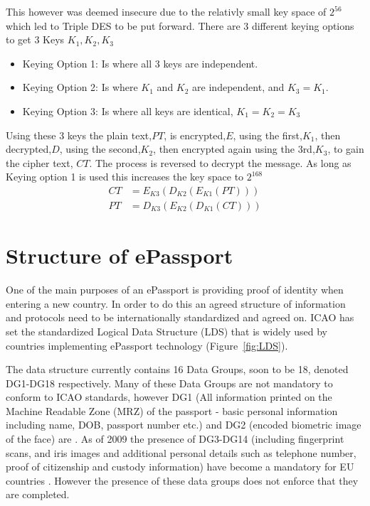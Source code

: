 \documentclass[12pt]{article}
\begin{document}
This however was deemed insecure due to the relativly small key space of $2^{56}$ which led to Triple DES to be put forward. There are 3 different keying options to get 3 Keys $K_1,K_2,K_3$
\begin{itemize}
    \item Keying Option 1: Is where all 3 keys are independent.
    \item Keying Option 2: Is where $K_1$ and $K_2$ are independent, and $K_3 = K_1$.
    \item Keying Option 3: Is where all keys are identical, $K_1 = K_2 = K_3$
\end{itemize}

Using these 3 keys the plain text,$PT$, is encrypted,$E$, using the first,$K_1$, then decrypted,$D$, using the second,$K_2$, then encrypted again using the 3rd,$K_3$, to gain the cipher text, $CT$. The process is reversed to decrypt the message. As long as Keying option 1 is used this increases the key space to $2^{168}$
\begin{align}
    CT &= E_{K3}(D_{K2}(E_{K1}(PT)))\\
    PT &= D_{K3}(E_{K2}(D_{K1}(CT)))
\end{align}
\section{Structure of ePassport}
\label{sec:LDS}
One of the main purposes of an ePassport is providing proof of identity when entering a new country. In order to do this an agreed structure of information and protocols need to be internationally standardized and agreed on. ICAO has set the standardized Logical Data Structure (LDS) that is widely used by countries implementing ePassport technology (Figure~\ref{fig:LDS}).

The data structure currently contains 16 Data Groups, soon to be 18, denoted DG1-DG18 respectively. Many of these Data Groups are not mandatory to conform to ICAO standards, however DG1 (All information printed on the Machine Readable Zone (MRZ) of the passport - basic personal information including name, DOB, passport number etc.) and DG2 (encoded biometric image of the face) are \cite{Anonymous:2006vu}. As of 2009 the presence of DG3-DG14 (including fingerprint scans, and iris images and additional personal details such as telephone number, proof of citizenship and custody information) have become a mandatory for EU countries \cite{Anonymous:2011vj}. However the presence of these data groups does not enforce that they are completed.
\end{document}
